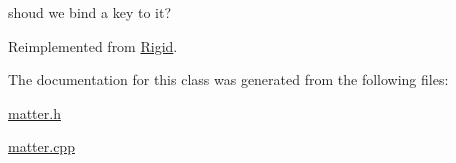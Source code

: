 shoud we bind a key to it? 



Reimplemented from \hyperlink{classRigid_a213d4ddd819ea799b7a29961b0d66f39}{Rigid}.



The documentation for this class was generated from the following files\+:\begin{DoxyCompactItemize}
\item 
\hyperlink{matter_8h}{matter.\+h}\item 
\hyperlink{matter_8cpp}{matter.\+cpp}\end{DoxyCompactItemize}
